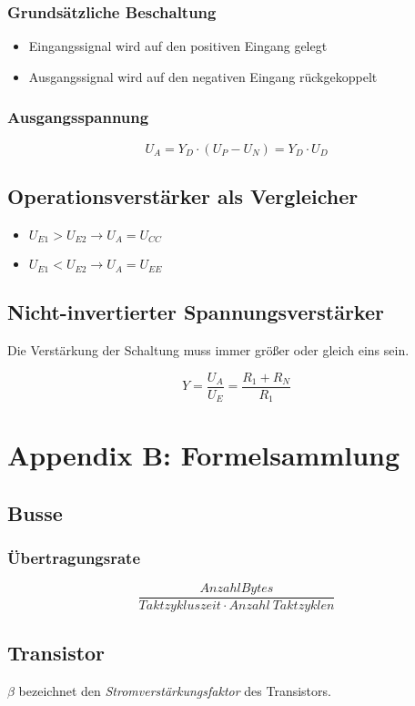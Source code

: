 \subsubsection{Grundsätzliche Beschaltung}
\begin{itemize}
	\item Eingangssignal wird auf den positiven Eingang gelegt
	\item Ausgangssignal wird auf den negativen Eingang rückgekoppelt
\end{itemize}

\subsubsection{Ausgangsspannung}
\[U_A = Y_D \cdot (U_P - U_N) = Y_D \cdot U_D\]


\subsection{Operationsverstärker als Vergleicher}
\begin{itemize}
	\item $U_{E1} > U_{E2} \rightarrow U_A = U_{CC}$
	\item $U_{E1} < U_{E2} \rightarrow U_A = U_{EE}$
\end{itemize}


\subsection{Nicht-invertierter Spannungsverstärker}
Die Verstärkung der Schaltung muss immer größer oder gleich eins sein.

\[Y = \frac{U_A}{U_E} = \frac{R_1 + R_N}{R_1}\]



\section{Appendix B: Formelsammlung}

\subsection{Busse}

\subsubsection{Übertragungsrate}
\[\frac{AnzahlBytes}{Taktzykluszeit \cdot Anzahl~Taktzyklen}\]


\subsection{Transistor}
$\beta$ bezeichnet den \textit{Stromverstärkungsfaktor} des Transistors.

